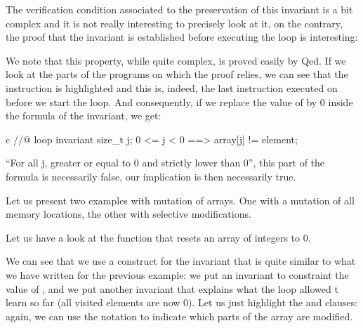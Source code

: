 The verification condition associated to the preservation of this invariant is
a bit complex and it is not really interesting to precisely look at it,
on the contrary, the proof that the invariant is established before
executing the loop is interesting:





We note that this property, while quite complex, is proved easily
by Qed. If we look at the parts of the programs on which the proof
relies, we can see that the instruction  is highlighted
and this is, indeed, the last instruction executed on  before
we start the loop. And consequently, if we replace the value of
 by 0 inside the formula of the invariant, we get:



\begin{CodeBlock}{c}
//@ loop invariant \forall size_t j; 0 <= j < 0 ==> array[j] != element;
\end{CodeBlock}



``For all j, greater or equal to 0 and strictly lower than 0'', this
part of the formula is necessarily false, our implication is then
necessarily true.





Let us present two examples with mutation of arrays. One with a mutation
of all memory locations, the other with selective modifications.





Let us have a look at the function that resets an array of integers to 0.






We can see that we use a construct for the invariant that is quite similar
to what we have written for the previous example: we put an invariant to
constraint the value of , and we put another invariant that
explains what the loop allowed t learn so far (all visited elements are now
$0$). Let us just highlight the  and
 clauses: again, we can use the notation
 to indicate which parts of the array are modified.



